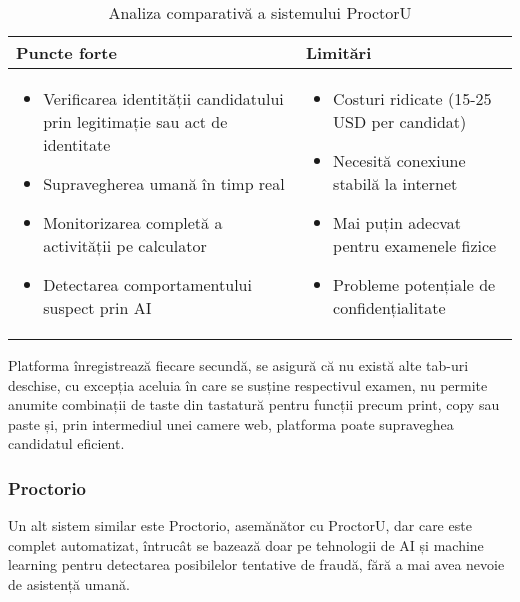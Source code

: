 \documentclass[12pt,a4paper]{article}
\begin{document}
\begin{table}[h]
\centering
\begin{tabular}{|p{8.5cm}|p{8.5cm}|}
\hline
\textbf{Puncte forte} & \textbf{Limitări} \\
\hline
\begin{itemize}
    \item Verificarea identității candidatului prin legitimație sau act de identitate
    \item Supravegherea umană în timp real
    \item Monitorizarea completă a activității pe calculator
    \item Detectarea comportamentului suspect prin AI
\end{itemize} & 
\begin{itemize}
    \item Costuri ridicate (15-25 USD per candidat)
    \item Necesită conexiune stabilă la internet
    \item Mai puțin adecvat pentru examenele fizice
    \item Probleme potențiale de confidențialitate
\end{itemize} \\
\hline
\end{tabular}
\caption{Analiza comparativă a sistemului ProctorU}
\end{table}

Platforma înregistrează fiecare secundă, se asigură că nu există alte tab-uri
deschise, cu excepția aceluia în care se susține respectivul examen,
nu permite anumite combinații de taste din tastatură pentru funcții precum 
print, copy sau paste și, prin intermediul unei camere web, platforma poate 
supraveghea candidatul eficient.

\subsubsection{Proctorio}
\hspace{6mm}Un alt sistem similar este Proctorio, asemănător cu
ProctorU, dar care este complet automatizat, întrucât se bazează doar
pe tehnologii de AI și machine learning pentru detectarea posibilelor
tentative de fraudă, fără a mai avea nevoie de asistență umană.
\end{document}
